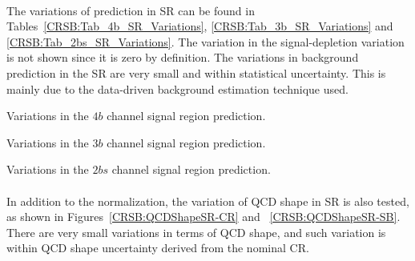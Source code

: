 \paragraph{}
The variations of prediction in SR can be found in Tables~\ref{CRSB:Tab_4b_SR_Variations}, \ref{CRSB:Tab_3b_SR_Variations} and \ref{CRSB:Tab_2bs_SR_Variations}. 
The variation in the signal-depletion variation is not shown since it is zero by definition. 
The variations in background prediction in the SR are very small and within statistical uncertainty. This is mainly due to the data-driven background estimation technique used.

\begin{table}[htbp!]
\caption{Variations in the $4b$ channel signal region prediction.}
\begin{center}

\end{center}
\label{CRSB:Tab_4b_SR_Variations}
\end{table}

\begin{table}[htbp!]
\caption{Variations in the $3b$ channel signal region prediction.}
\begin{center}

\end{center}
\label{CRSB:Tab_3b_SR_Variations}
\end{table}

\begin{table}[htbp!]
\caption{Variations in the $2bs$ channel signal region prediction.}
\begin{center}

\end{center}
\label{CRSB:Tab_2bs_SR_Variations}
\end{table}

\paragraph{}
In addition to the normalization, the variation of QCD shape in SR is also tested, as shown in Figures~\ref{CRSB:QCDShapeSR-CR} and ~\ref{CRSB:QCDShapeSR-SB}. 
There are very small variations in terms of QCD shape, and such variation is within QCD shape uncertainty derived from the nominal CR. 

